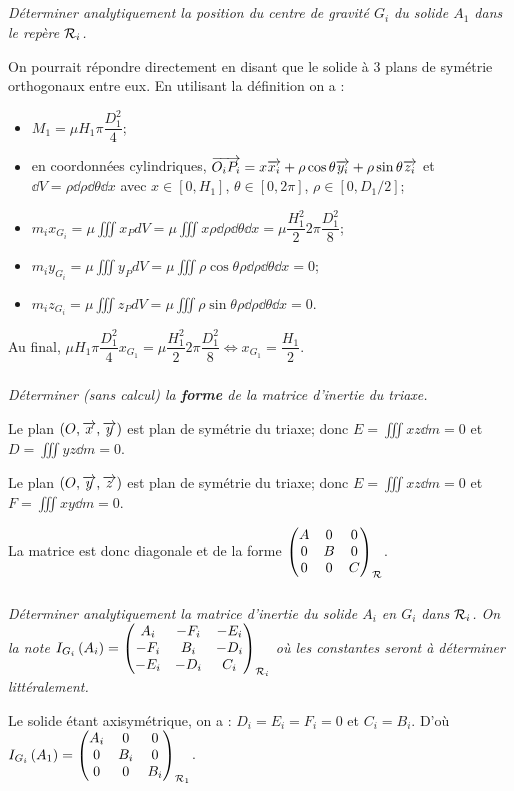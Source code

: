 \documentclass[10pt,fleqn]{article} %
\begin{document}
\begin{multicols}{2}
\subparagraph{}
\textit{Déterminer analytiquement la position du centre de gravité $G_i$ du solide $A_1$ dans le repère $\rep{i}$.}
\ifprof
\begin{corrige}
On pourrait répondre directement en disant que le solide à 3 plans de symétrie orthogonaux entre eux. 
En utilisant la définition on a :
\begin{itemize}
\item $M_1 =\mu H_1\pi \dfrac{D_1^2}{4}$;
\item en coordonnées cylindriques, $\vect{O_iP_i}=x\vect{x_i}+ \rho \cos\theta \vect{y_i}+\rho \sin\theta \vect{z_i}$ et $\dd V = \rho\dd \rho \dd \theta \dd x$ avec $x\in[0,H_1]$, $\theta\in [0,2\pi]$, $\rho \in \left[0,D_1/2\right]$;
\item $m_ix_{G_i}=\mu \iiint x_P dV = \mu \iiint x  \rho\dd \rho \dd \theta \dd x= \mu \dfrac{H_1^2}{2} 2\pi \dfrac{D_1^2}{8}$;
\item $m_iy_{G_i}=\mu \iiint y_P dV = \mu \iiint \rho \cos\theta   \rho\dd \rho \dd \theta \dd x=0$;
\item $m_iz_{G_i}=\mu \iiint z_P dV = \mu \iiint \rho \sin\theta  \rho\dd \rho \dd \theta \dd x=0$. 
\end{itemize}
Au final,  $\mu H_1\pi  \dfrac{D_1^2}{4}x_{G_1}=\mu \dfrac{H_1^2}{2}  2\pi  \dfrac{D_1^2}{8} \Leftrightarrow   x_{G_1}= \dfrac{H_1}{2}$.
\end{corrige}
\else
\fi



\subparagraph{}
\textit{Déterminer (sans calcul) la \textbf{forme} de la matrice d'inertie du triaxe.}
\ifprof
\begin{corrige}

Le plan $\left(O,\vect{x},\vect{y}\right)$ est plan de symétrie du triaxe; donc $E = \iiint xz \dd m = 0 $ et $D = \iiint yz \dd m = 0 $.

Le plan $\left(O,\vect{y},\vect{z}\right)$ est plan de symétrie du triaxe; donc $E = \iiint xz \dd m = 0 $ et $F = \iiint xy \dd m = 0 $.

La matrice est donc diagonale et de la forme $\matinertie{A}{B}{C}{0}{0}{0}{\rep{}}$.

\end{corrige}
\else
\fi

\subparagraph{}
\textit{Déterminer analytiquement la matrice d'inertie du solide $A_i$ en $G_
i$ dans $\rep{i}$. On la note $\inertie{G_i}{A_i}=\matinertie{A_i}{B_i}{C_i}{-D_i}{-E_i}{-F_i}{\rep{i}}$ où les constantes seront à déterminer littéralement.}
\ifprof
\begin{corrige}
Le solide étant axisymétrique, on a : $D_i=E_i=F_i = 0$ et $C_i=B_i$. D'où  $\inertie{G_i}{A_1}=\matinertie{A_i}{B_i}{B_i}{0}{0}{0}{\rep{1}}$.


\end{corrige}
\end{multicols}
\end{document}
